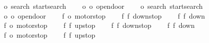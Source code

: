 \begin{isabellebody}
\isanewline
\ \ \ \ {\isacharparenleft}{\isacharparenleft}o{}{\isacharcomma}\ search{\isacharparenright}{\isacharcomma}\ startsearch{\isacharparenright}{\isacharcomma}\isanewline
\ \ \ \ {\isacharparenleft}{\isacharparenleft}o{}{\isacharcomma}\ o{}{\isacharparenright}{\isacharcomma}\ opendoor{}{\isacharparenright}{\isacharcomma}\isanewline
\isanewline
\ \ \ \ {\isacharparenleft}{\isacharparenleft}o{}{\isacharcomma}\ search{\isacharparenright}{\isacharcomma}\ startsearch{\isacharparenright}{\isacharcomma}\isanewline
\ \ \ \ {\isacharparenleft}{\isacharparenleft}o{}{\isacharcomma}\ o{}{\isacharparenright}{\isacharcomma}\ opendoor{}{\isacharparenright}{\isacharcomma}\isanewline
\isanewline
\ \ \ \ {\isacharparenleft}{\isacharparenleft}f{}{\isacharcomma}\ o{}{\isacharparenright}{\isacharcomma}\ motorstop{}{\isacharparenright}{\isacharcomma}\isanewline
\ \ \ \ {\isacharparenleft}{\isacharparenleft}f{}{\isacharcomma}\ f{}{\isacharparenright}{\isacharcomma}\ down{}{}stop{\isacharparenright}{\isacharcomma}\isanewline
\ \ \ \ {\isacharparenleft}{\isacharparenleft}f{}{\isacharcomma}\ f{}{\isacharparenright}{\isacharcomma}\ down{}{}{\isacharparenright}{\isacharcomma}\isanewline
\isanewline
\ \ \ \ {\isacharparenleft}{\isacharparenleft}f{}{\isacharcomma}\ o{}{\isacharparenright}{\isacharcomma}\ motorstop{}{\isacharparenright}{\isacharcomma}\isanewline
\ \ \ \ {\isacharparenleft}{\isacharparenleft}f{}{\isacharcomma}\ f{}{\isacharparenright}{\isacharcomma}\ up{}{}stop{\isacharparenright}{\isacharcomma}\isanewline
\ \ \ \ {\isacharparenleft}{\isacharparenleft}f{}{\isacharcomma}\ f{}{\isacharparenright}{\isacharcomma}\ down{}{}stop{\isacharparenright}{\isacharcomma}\isanewline
\ \ \ \ {\isacharparenleft}{\isacharparenleft}f{}{\isacharcomma}\ f{}{\isacharparenright}{\isacharcomma}\ down{}{}{\isacharparenright}{\isacharcomma}\isanewline
\isanewline
\ \ \ \ {\isacharparenleft}{\isacharparenleft}f{}{\isacharcomma}\ o{}{\isacharparenright}{\isacharcomma}\ motorstop{}{\isacharparenright}{\isacharcomma}\isanewline
\ \ \ \ {\isacharparenleft}{\isacharparenleft}f{}{\isacharcomma}\ f{}{\isacharparenright}{\isacharcomma}\ up{}{}stop{\isacharparenright}{\isacharcomma}\isanewline

\end{isabellebody}

